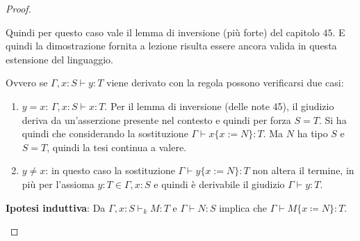 \begin{proof}
\begin{itemize}
\begin{itemize}
		Quindi per questo caso vale il lemma di inversione (pi\`u forte) del capitolo $45$. E quindi la dimostrazione fornita a lezione
		risulta essere ancora valida in questa estensione del linguaggio.
		
		Ovvero se $\Gamma , x : S \vdash y : T$ viene derivato con la regola  possono verificarsi due casi:
		\begin{enumerate}
			\item $y = x$:  $\Gamma , x : S \vdash x : T$. Per il lemma di inversione (delle note 45), il giudizio deriva da un'asserzione presente nel contesto e quindi per forza $S = T$. Si ha quindi che considerando la sostituzione $\Gamma \vdash x\{x:=N\}:T $. Ma $N$ ha tipo $S$ e $S = T$, quindi la tesi continua a valere.
			\item $y \neq x$: in questo caso la sostituzione $\Gamma \vdash y\{x:=N\}:T $ non altera il termine, in pi\`u per l'assioma  $y : T \in \Gamma, x :S$ e quindi \`e derivabile il giudizio $\Gamma \vdash y :T$.
		\end{enumerate}\vspace{.5em}

		\noindent \textbf{Ipotesi induttiva}: Da $\Gamma, x : S \vdash_k M : T$ e $\Gamma \vdash N : S$ implica che 
		$\Gamma \vdash M\{x \coloneqq N\} : T$.
		

\end{itemize}
\end{itemize}
\end{proof}
